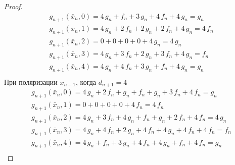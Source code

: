 \documentclass[bibliography=totoc, a4paper, 14pt]{extarticle}
\begin{document}
\begin{proof}
$$\begin{array}{l}
g_{n+1}(\bar{x}_n, 0) = 4\,g_n + f_n + 3\,g_n + 4\,f_n + 4\,g_n = g_n \\
g_{n+1}(\bar{x}_n, 1) = 4\,g_n + 2\,f_n + 2\,g_n + 2\,f_n + 4\,g_n = 4\,f_n \\
g_{n+1}(\bar{x}_n, 2) = 0 + 0 + 0 + 0 + 4\,g_n = 4\,g_n \\
g_{n+1}(\bar{x}_n, 3) = 4\,g_n + 3\,f_n + 2\,g_n + 3\,f_n + 4\,g_n = f_n \\
g_{n+1}(\bar{x}_n, 4) = 4\,g_n + 4\,f_n + 3\,g_n + f_n + 4\,g_n = g_n \\
\end{array}$$
При поляризации $x_{n+1}$, когда $d_{n+1} = 4$
$$\begin{array}{l}
g_{n+1}(\bar{x}_n, 0) = 4\,g_n + 2\,f_n + g_n + f_n + g_n + 3\,f_n + 4\,f_n = g_n \\
g_{n+1}(\bar{x}_n, 1) = 0 + 0 + 0 + 0 + 4\,f_n = 4\,f_n \\
g_{n+1}(\bar{x}_n, 2) = 4\,g_n + 3\,f_n + 4\,g_n + f_n + g_n + 2\,f_n + 4\,f_n = 4\,g_n \\
g_{n+1}(\bar{x}_n, 3) = 4\,g_n + 4\,f_n + 2\,g_n + 4\,f_n + 4\,g_n + 4\,f_n + 4\,f_n = f_n \\
g_{n+1}(\bar{x}_n, 4) = 4\,g_n + f_n + 3\,g_n + 4\,f_n + 4\,g_n + f_n + 4\,f_n = g_n \\
\end{array}$$

\end{proof}
\end{document}
